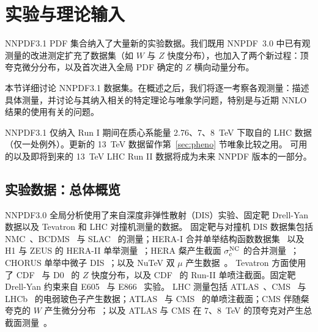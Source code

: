 \section{实验与理论输入}
\label{sec:expdata}

NNPDF3.1 PDF 集合纳入了大量新的实验数据。我们既用 NNPDF~3.0 中已有观测量的改进测定扩充了数据集（如 $W$ 与 $Z$ 快度分布），也加入了两个新过程：顶夸克微分分布，以及首次进入全局 PDF 确定的 $Z$ 横向动量分布。

本节详细讨论 NNPDF3.1 数据集。在概述之后，我们将逐一考察各观测量：描述具体测量，并讨论与其纳入相关的特定理论与唯象学问题，特别是与近期 NNLO 结果的使用有关的问题。

NNPDF3.1 仅纳入 Run I 期间在质心系能量 2.76、7、8~TeV 下取自的 LHC 数据（仅一处例外）。更新的 13~TeV 数据留作第~\ref{sec:pheno} 节唯象比较之用。
%
可用的以及即将到来的 13~TeV LHC Run II 数据将成为未来 NNPDF 版本的一部分。

\subsection{实验数据：总体概览}

NNPDF3.0 全局分析使用了来自深度非弹性散射（DIS）实验、固定靶 Drell-Yan 数据以及 Tevatron 和 LHC 对撞机测量的数据。
固定靶与对撞机 DIS 数据集包括 NMC~\cite{Arneodo:1996kd,Arneodo:1996qe}、BCDMS~\cite{bcdms1,bcdms2} 与 SLAC~\cite{Whitlow:1991uw} 的测量；HERA-I 合并单举结构函数数据集~\cite{Aaron:2009aa} 以及 H1 与 ZEUS 的 HERA-II 单举测量~\cite{Aaron:2012qi,Collaboration:2010ry,ZEUS:2012bx,Collaboration:2010xc}；HERA 粲产生截面 $\sigma_{c}^{\rm NC}$ 的合并测量~\cite{Abramowicz:1900rp}；CHORUS 单举中微子 DIS~\cite{Onengut:2005kv}；以及 NuTeV 双 $\mu$ 产生数据~\cite{Goncharov:2001qe,MasonPhD}。
%
Tevatron 方面使用了 CDF~\cite{Aaltonen:2010zza} 与 D0~\cite{Abazov:2007jy} 的 $Z$ 快度分布，以及 CDF~\cite{Aaltonen:2008eq} 的 Run-II 单喷注截面。固定靶 Drell-Yan 约束来自 E605~\cite{Moreno:1990sf} 与 E866~\cite{Webb:2003ps,Webb:2003bj,Towell:2001nh} 实验。
%
LHC 测量包括 ATLAS~\cite{Aad:2011dm,Aad:2013iua,Aad:2011fp}、CMS~\cite{Chatrchyan:2012xt,Chatrchyan:2013mza,Chatrchyan:2013tia} 与 LHCb~\cite{Aaij:2012vn,Aaij:2012mda} 的电弱玻色子产生数据；ATLAS~\cite{Aad:2011fc,Aad:2013lpa} 与 CMS~\cite{Chatrchyan:2012bja} 的单喷注截面；CMS 伴随粲夸克的 $W$ 产生微分分布~\cite{Chatrchyan:2013uja}；以及 ATLAS 与 CMS 在 7、8~TeV 的顶夸克对产生总截面测量~\cite{ATLAS:2012aa,ATLAS:2011xha,TheATLAScollaboration:2013dja, Chatrchyan:2013faa,Chatrchyan:2012bra,Chatrchyan:2012ria}。

